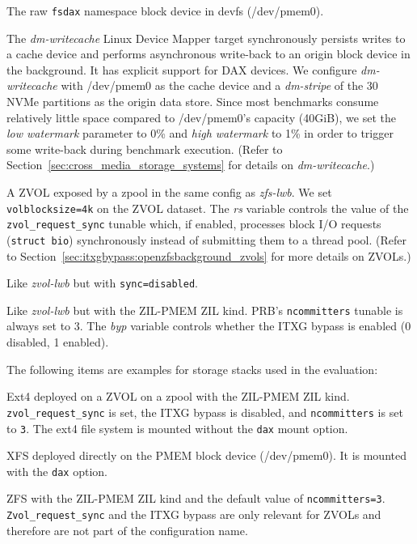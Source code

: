 \documentclass[12pt,a4paper,twoside]{book}
\begin{document}
\begin{description}[noitemsep,leftmargin=1.5cm,labelindent=1cm]
    \item[devpmem] The raw \lstinline{fsdax} namespace block device in devfs (/dev/pmem0).
    \item[dm-writecache]
        The \textit{dm-writecache} Linux Device Mapper target synchro\-nously persists writes to a cache device and performs asynchronous write-back to an origin block device in the background.
        It has explicit support for DAX devices.
        We configure \textit{dm-writecache} with \mbox{/dev/pmem0} as the cache device and a \textit{dm-stripe} of the 30 NVMe partitions as the origin data store.
        Since most benchmarks consume relatively little space compared to /dev/pmem0's capacity (40GiB), we set the \textit{low watermark} parameter to 0\% and \textit{high watermark} to 1\% in order to trigger some write-back during benchmark execution.
        (Refer to Section~\ref{sec:cross_media_storage_systems} for details on \textit{dm-writecache}.)
    \item[zvol-lwb,rs=\{0,1\}]
        A ZVOL exposed by a zpool in the same config as \textit{zfs-lwb}.
        We set \lstinline{volblocksize=4k} on the ZVOL dataset.
        The \textit{rs} variable controls the value of the \lstinline{zvol_request_sync} tunable which, if enabled, processes block I/O requests (\lstinline[style=figurepseudocode]{struct bio}) synchronously instead of submitting them to a thread pool.
        (Refer to Section~\ref{sec:itxgbypass:openzfsbackground_zvols} for more details on ZVOLs.)
    \item[zvol-async] Like \textit{zvol-lwb} but with \lstinline{sync=disabled}.
    \item[zvol-pmem,rs=\{0,1\},byp=\{0,1\}] Like \textit{zvol-lwb} but with the ZIL-PMEM ZIL kind.
        PRB's \lstinline{ncommitters} tunable is always set to $3$.
        The \textit{byp} variable controls whether the ITXG bypass is enabled (0 disabled, 1 enabled).
\end{description}
The following items are examples for storage stacks used in the evaluation:
\begin{description}[noitemsep,leftmargin=1.5cm,labelindent=1cm]
    \item[ext4 on zvol-pmem,rs=1,byp=0] Ext4 deployed on a ZVOL on a zpool with the ZIL-PMEM ZIL kind.
        \lstinline{zvol_request_sync} is set, the ITXG bypass is disabled, and \lstinline{ncommitters} is set to \lstinline{3}.
        The ext4 file system is mounted without the \lstinline{dax} mount option.
    \item[xfs-dax on devpmem] XFS deployed directly on the PMEM block device (/dev/pmem0).
    It is mounted with the \lstinline{dax} option.
    \item[zfs-pmem] ZFS with the ZIL-PMEM ZIL kind and the default value of \lstinline{ncommitters=3}.
        \lstinline{Zvol_request_sync} and the ITXG bypass are only relevant for ZVOLs and therefore are not part of the configuration name.
\end{description}
\end{document}
